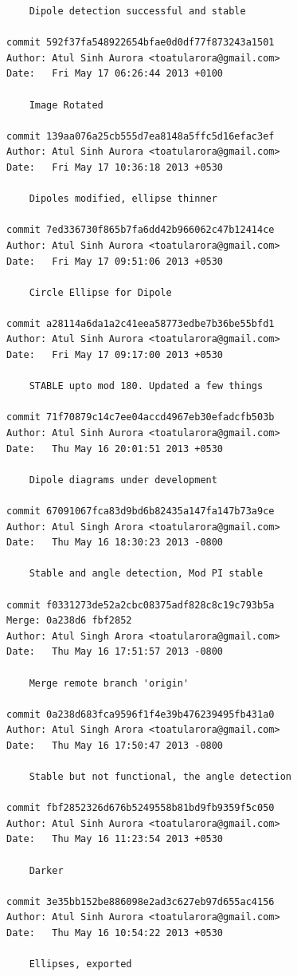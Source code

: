 \begin{lstlisting}
    Dipole detection successful and stable

commit 592f37fa548922654bfae0d0df77f873243a1501
Author: Atul Sinh Aurora <toatularora@gmail.com>
Date:   Fri May 17 06:26:44 2013 +0100

    Image Rotated

commit 139aa076a25cb555d7ea8148a5ffc5d16efac3ef
Author: Atul Sinh Aurora <toatularora@gmail.com>
Date:   Fri May 17 10:36:18 2013 +0530

    Dipoles modified, ellipse thinner

commit 7ed336730f865b7fa6dd42b966062c47b12414ce
Author: Atul Sinh Aurora <toatularora@gmail.com>
Date:   Fri May 17 09:51:06 2013 +0530

    Circle Ellipse for Dipole

commit a28114a6da1a2c41eea58773edbe7b36be55bfd1
Author: Atul Sinh Aurora <toatularora@gmail.com>
Date:   Fri May 17 09:17:00 2013 +0530

    STABLE upto mod 180. Updated a few things

commit 71f70879c14c7ee04accd4967eb30efadcfb503b
Author: Atul Sinh Aurora <toatularora@gmail.com>
Date:   Thu May 16 20:01:51 2013 +0530

    Dipole diagrams under development

commit 67091067fca83d9bd6b82435a147fa147b73a9ce
Author: Atul Singh Arora <toatularora@gmail.com>
Date:   Thu May 16 18:30:23 2013 -0800

    Stable and angle detection, Mod PI stable

commit f0331273de52a2cbc08375adf828c8c19c793b5a
Merge: 0a238d6 fbf2852
Author: Atul Singh Arora <toatularora@gmail.com>
Date:   Thu May 16 17:51:57 2013 -0800

    Merge remote branch 'origin'

commit 0a238d683fca9596f1f4e39b476239495fb431a0
Author: Atul Singh Arora <toatularora@gmail.com>
Date:   Thu May 16 17:50:47 2013 -0800

    Stable but not functional, the angle detection

commit fbf2852326d676b5249558b81bd9fb9359f5c050
Author: Atul Sinh Aurora <toatularora@gmail.com>
Date:   Thu May 16 11:23:54 2013 +0530

    Darker

commit 3e35bb152be886098e2ad3c627eb97d655ac4156
Author: Atul Sinh Aurora <toatularora@gmail.com>
Date:   Thu May 16 10:54:22 2013 +0530

    Ellipses, exported


\end{lstlisting}
